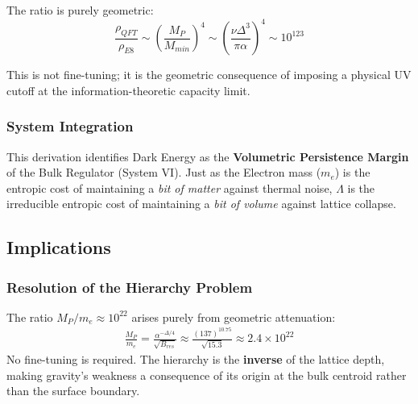 The ratio is purely geometric:
\begin{equation}
    \frac{\rho_{QFT}}{\rho_{E8}} \sim \left(\frac{M_P}{M_{min}}\right)^4 
    \sim \left(\frac{\nu\Delta^3}{\pi\alpha}\right)^4 
    \sim 10^{123}
\end{equation}

This is not fine-tuning; it is the geometric consequence of imposing a physical UV cutoff at the information-theoretic capacity limit.

\subsubsection{System Integration}
This derivation identifies Dark Energy as the \textbf{Volumetric Persistence Margin} of the Bulk Regulator (System VI). Just as the Electron mass ($m_e$) is the entropic cost of maintaining a \emph{bit of matter} against thermal noise, $\Lambda$ is the irreducible entropic cost of maintaining a \emph{bit of volume} against lattice collapse.

\subsection{Implications}

\subsubsection{Resolution of the Hierarchy Problem}
The ratio $M_P/m_e \approx 10^{22}$ arises purely from geometric attenuation:
\begin{equation}
\begin{split}
\frac{M_P}{m_e} = \frac{\alpha^{-\Delta/4}}{\sqrt{B_{res}}} \approx \frac{(137)^{10.75}}{\sqrt{15.3}} \approx 2.4 \times 10^{22}
\end{split}
\end{equation}
No fine-tuning is required. The hierarchy is the \textbf{inverse} of the lattice depth, making gravity's weakness a consequence of its origin at the bulk centroid rather than the surface boundary.

